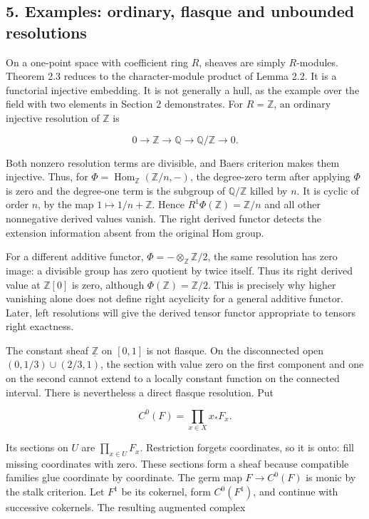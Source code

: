 \documentclass[
  english,
  11pt,
  a4paper,
]{article}
\begin{document}
\subsection{5. Examples: ordinary, flasque and unbounded
resolutions}\label{injective-modules-and-bounded-below-derived-functors--5-examples-ordinary-flasque-and-unbounded-resolutions}

On a one-point space with coefficient ring \(R\), sheaves are simply
\(R\)-modules. Theorem 2.3 reduces to the character-module product of
Lemma 2.2. It is a functorial injective embedding. It is not generally a
hull, as the example over the field with two elements in Section 2
demonstrates. For \(R=\mathbb Z\), an ordinary injective resolution of
\(\mathbb Z\) is

\[0\longrightarrow\mathbb Z\longrightarrow\mathbb Q
\longrightarrow\mathbb Q/\mathbb Z\longrightarrow0.\]

Both nonzero resolution terms are divisible, and Baer\textquotesingle s
criterion makes them injective. Thus, for
\(\Phi=\operatorname{Hom}_{\mathbb Z}(\mathbb Z/n,-)\), the degree-zero
term after applying \(\Phi\) is zero and the degree-one term is the
subgroup of \(\mathbb Q/\mathbb Z\) killed by \(n\). It is cyclic of
order \(n\), by the map \(1\mapsto 1/n+\mathbb Z\). Hence
\(R^1\Phi(\mathbb Z)=\mathbb Z/n\) and all other nonnegative derived
values vanish. The right derived functor detects the extension
information absent from the original Hom group.

For a different additive functor,
\(\Phi=-\otimes_{\mathbb Z}\mathbb Z/2\), the same resolution has zero
image: a divisible group has zero quotient by twice itself. Thus its
right derived value at \(\mathbb Z[0]\) is zero, although
\(\Phi(\mathbb Z)=\mathbb Z/2\). This is precisely why higher vanishing
alone does not define right acyclicity for a general additive functor.
Later, left resolutions will give the derived tensor functor appropriate
to tensor\textquotesingle s right exactness.

The constant sheaf \(\underline{\mathbb Z}\) on \([0,1]\) is not
flasque. On the disconnected open \((0,1/3)\cup(2/3,1)\), the section
with value zero on the first component and one on the second cannot
extend to a locally constant function on the connected interval. There
is nevertheless a direct flasque resolution. Put

\[C^0(F)=\prod_{x\in X}x_*F_x.\]

Its sections on \(U\) are \(\prod_{x\in U}F_x\). Restriction forgets
coordinates, so it is onto: fill missing coordinates with zero. These
sections form a sheaf because compatible families glue coordinate by
coordinate. The germ map \(F\to C^0(F)\) is monic by the stalk
criterion. Let \(F^1\) be its cokernel, form \(C^0(F^1)\), and continue
with successive cokernels. The resulting augmented complex
\end{document}
